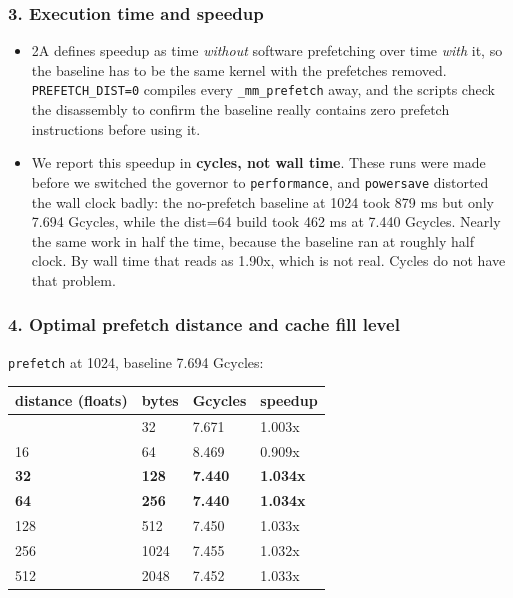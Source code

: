 \documentclass[
  10pt,
]{article}
\newcounter{none} %
\begin{document}
\subsubsection{3. Execution time and speedup}\label{a-speedup}

\begin{itemize}
\item
  2A defines speedup as time \emph{without} software prefetching over time
  \emph{with} it, so the baseline has to be the same kernel with the prefetches
  removed. \texttt{PREFETCH\_DIST=0} compiles every \texttt{\_mm\_prefetch} away,
  and the scripts check the disassembly to confirm the baseline really contains
  zero prefetch instructions before using it.

\item
  We report this speedup in \textbf{cycles, not wall time}. These runs were made
  before we switched the governor to \texttt{performance}, and
  \texttt{powersave} distorted the wall clock badly: the no-prefetch baseline at
  1024 took 879 ms but only 7.694 Gcycles, while the dist=64 build took 462 ms at
  7.440 Gcycles. Nearly the same work in half the time, because the baseline ran
  at roughly half clock. By wall time that reads as 1.90x, which is not real.
  Cycles do not have that problem.
\end{itemize}

\subsubsection{4. Optimal prefetch distance and cache fill
level}\label{a-optimal}

\texttt{prefetch} at 1024, baseline 7.694 Gcycles:

{\def\LTcaptype{none} %
\begin{longtable}[]{@{}llll@{}}
\toprule\noalign{}
distance (floats) & bytes & Gcycles & speedup \\
\midrule\noalign{}
\endhead
\bottomrule\noalign{}
\endlastfoot
8 & 32 & 7.671 & 1.003x \\
16 & 64 & 8.469 & 0.909x \\
\textbf{32} & \textbf{128} & \textbf{7.440} & \textbf{1.034x} \\
\textbf{64} & \textbf{256} & \textbf{7.440} & \textbf{1.034x} \\
128 & 512 & 7.450 & 1.033x \\
256 & 1024 & 7.455 & 1.032x \\
512 & 2048 & 7.452 & 1.033x \\
\end{longtable}
}
\end{document}
